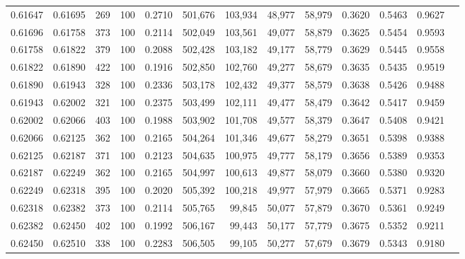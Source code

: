 \begin{tabular}{rrrrrrrrrrrrr}
0.61647 & 0.61695 &   269 & 100 &                                     0.2710 & 501,676 & 103,934 &  48,977 &  58,979 & 0.3620 & 0.5463 & 0.9627 \\
0.61696 & 0.61758 &   373 & 100 &                                     0.2114 & 502,049 & 103,561 &  49,077 &  58,879 & 0.3625 & 0.5454 & 0.9593 \\
0.61758 & 0.61822 &   379 & 100 &                                     0.2088 & 502,428 & 103,182 &  49,177 &  58,779 & 0.3629 & 0.5445 & 0.9558 \\
0.61822 & 0.61890 &   422 & 100 &                                     0.1916 & 502,850 & 102,760 &  49,277 &  58,679 & 0.3635 & 0.5435 & 0.9519 \\
0.61890 & 0.61943 &   328 & 100 &                                     0.2336 & 503,178 & 102,432 &  49,377 &  58,579 & 0.3638 & 0.5426 & 0.9488 \\
0.61943 & 0.62002 &   321 & 100 &                                     0.2375 & 503,499 & 102,111 &  49,477 &  58,479 & 0.3642 & 0.5417 & 0.9459 \\
0.62002 & 0.62066 &   403 & 100 &                                     0.1988 & 503,902 & 101,708 &  49,577 &  58,379 & 0.3647 & 0.5408 & 0.9421 \\
0.62066 & 0.62125 &   362 & 100 &                                     0.2165 & 504,264 & 101,346 &  49,677 &  58,279 & 0.3651 & 0.5398 & 0.9388 \\
0.62125 & 0.62187 &   371 & 100 &                                     0.2123 & 504,635 & 100,975 &  49,777 &  58,179 & 0.3656 & 0.5389 & 0.9353 \\
0.62187 & 0.62249 &   362 & 100 &                                     0.2165 & 504,997 & 100,613 &  49,877 &  58,079 & 0.3660 & 0.5380 & 0.9320 \\
0.62249 & 0.62318 &   395 & 100 &                                     0.2020 & 505,392 & 100,218 &  49,977 &  57,979 & 0.3665 & 0.5371 & 0.9283 \\
0.62318 & 0.62382 &   373 & 100 &                                     0.2114 & 505,765 &  99,845 &  50,077 &  57,879 & 0.3670 & 0.5361 & 0.9249 \\
0.62382 & 0.62450 &   402 & 100 &                                     0.1992 & 506,167 &  99,443 &  50,177 &  57,779 & 0.3675 & 0.5352 & 0.9211 \\
0.62450 & 0.62510 &   338 & 100 &                                     0.2283 & 506,505 &  99,105 &  50,277 &  57,679 & 0.3679 & 0.5343 & 0.9180 \\

\end{tabular}
